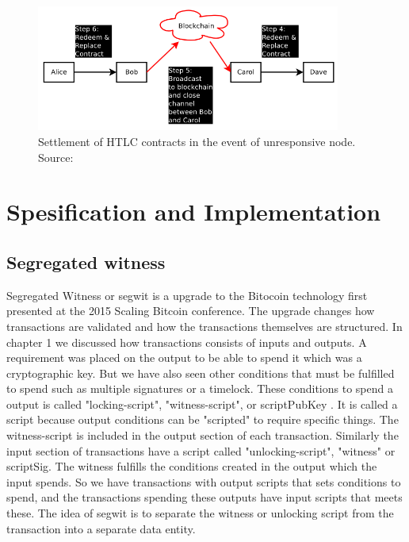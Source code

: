 \documentclass[informationsecurity]{gucmasterproject}
\begin{document}
\begin{figure}[h]
    \centering
    \includegraphics[width=10cm]{figs/htlc_bc.png}
    \caption{ Settlement of HTLC contracts in the event of unresponsive node. Source: \cite{poon2015bitcoin}}
    \label{fig:htlc_bc}
\end{figure}


\chapter{Spesification and Implementation}

\section{Segregated witness}
Segregated Witness or segwit is a upgrade to the Bitocoin technology first presented at the 2015 Scaling Bitcoin conference\cite{SB_segwit}. The upgrade changes how transactions are validated and how the transactions themselves are structured.
In chapter 1 we discussed how transactions consists of inputs and outputs. A requirement was placed on the output to be able to spend it which was a cryptographic key. But we have also seen other conditions that must be fulfilled to spend such as multiple signatures or a timelock. These conditions to spend a output is called "locking-script", "witness-script", or scriptPubKey \cite{antonopoulos2017mastering}. It is called a script because output conditions can be "scripted" to require specific things. The witness-script is included in the output section of each transaction. Similarly the input section of transactions have a script called "unlocking-script", "witness" or scriptSig. The witness fulfills the conditions created in the output which the input spends. So we have transactions with output scripts that sets conditions to spend, and the transactions spending these outputs have input scripts that meets these. The idea of segwit is to separate the witness or unlocking script from the transaction into a separate data entity. 
\end{document}
